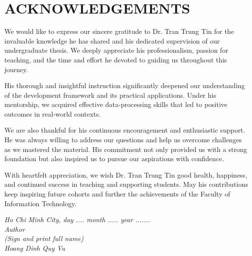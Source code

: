 \chapter*{ACKNOWLEDGEMENTS}
We would like to express our sincere gratitude to Dr. Tran Trung Tin for the invaluable knowledge he has shared and his dedicated supervision of our undergraduate thesis. We deeply appreciate his professionalism, passion for teaching, and the time and effort he devoted to guiding us throughout this journey.

His thorough and insightful instruction significantly deepened our understanding of the development framework and its practical applications. Under his mentorship, we acquired effective data-processing skills that led to positive outcomes in real-world contexts.

We are also thankful for his continuous encouragement and enthusiastic support. He was always willing to address our questions and help us overcome challenges as we mastered the material. His commitment not only provided us with a strong foundation but also inspired us to pursue our aspirations with confidence.

With heartfelt appreciation, we wish Dr. Tran Trung Tin good health, happiness, and continued success in teaching and supporting students. May his contributions keep inspiring future cohorts and further the achievements of the Faculty of Information Technology.

\vspace*{1cm}
\begin{flushright}
	\begin{minipage}{8.75cm}
		\centering\itshape
		Ho Chi Minh City, day .... month .....  year .......\\
		Author\\[3cm]
		(Sign and print full name)\\
		Hoang Dinh Quy Vu
	\end{minipage}
\end{flushright}
\newpage